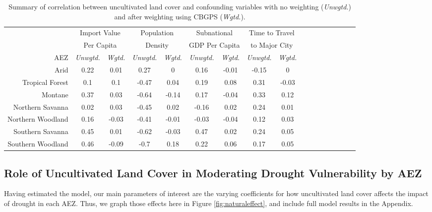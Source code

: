 \documentclass{article}
\begin{document}
\begin{table}[h!]
	\begin{center}
		\begin{tabular}{r | c c c c c c c c c c c c c c c c }
&	\multicolumn{2}{c}{Import Value} &	\multicolumn{2}{c}{Population} &	\multicolumn{2}{c}{Subnational}	&	\multicolumn{2}{c}{Time to Travel}	\\
&	\multicolumn{2}{c}{Per Capita} &	\multicolumn{2}{c}{Density} &	\multicolumn{2}{c}{GDP Per Capita}	&	\multicolumn{2}{c}{to Major City}	\\
	\cmidrule(lr){2-3}\cmidrule(lr){4-5} \cmidrule(lr){6-7}\cmidrule(lr){8-9}
      AEZ	&	\textit{Unwgtd.}	&	\textit{Wgtd.}	&	\textit{Unwgtd.}	&	\textit{Wgtd.}	&	\textit{Unwgtd.}	&	\textit{Wgtd.}	&	\textit{Unwgtd.}	&	\textit{Wgtd.}	\\
\hline									
Arid	&	0.22	&	0.01	&	0.27	&	0 &	0.16	&	-0.01	&	-0.15	&	0	\\
Tropical Forest	&	0.1	&	0.1	&	-0.47	&	0.04&	0.19	&	0.08	&	0.31	&	-0.03	\\
Montane	&	0.37	&	0.03	&	-0.64	&	-0.14&	0.17	&	-0.04	&	0.33	&	0.12	\\
Northern Savanna	&	0.02	&	0.03	&	-0.45	&	0.02&	-0.16	&	0.02	&	0.24	&	0.01	\\
Northern Woodland	&	0.16	&	-0.03	&	-0.41	&	-0.01&	-0.03	&	-0.04	&	0.12	&	0.03	\\
Southern Savanna	&	0.45	&	0.01	&	-0.62	&	-0.03&	0.47	&	0.02	&	0.24	&	0.05	\\
Southern Woodland	&	0.46	&	-0.09	&	-0.7	&	0.18&	0.22	&	0.06	&	0.17	&	0.05	\\	
		\end{tabular}
    \caption{Summary of correlation between uncultivated land cover and confounding variables with no weighting (\textit{Unwgtd.}) and after weighting using CBGPS (\textit{Wgtd.}).}
	\label{tab:CBPSsum}
	\end{center}
\end{table}

\subsection{Role of Uncultivated Land Cover in Moderating Drought Vulnerability by AEZ}

Having estimated the model, our main parameters of interest are the varying coefficients for how uncultivated land cover affects the impact of drought in each AEZ.  Thus, we graph those effects here in Figure \ref{fig:naturaleffect}, and include full model results in the Appendix.
\end{document}
